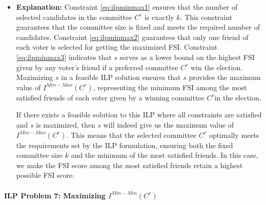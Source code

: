 \documentclass{article}
\begin{document}
\begin{itemize}
\item  \textbf{Explanation:}
Constraint \ref{eq:ilpminmax1} ensures that the number of selected candidates in the committee \(C^r\) is exactly \(k\). This constraint guarantees that the committee size is fixed and meets the required number of candidates.
Constraint \ref{eq:ilpminmax2} guarantees that only one friend of each voter is selected for getting the maximized FSI.
Constraint \ref{eq:ilpminmax3} indicates that \(s\) serves as a lower bound on the highest FSI given by any voter's friend if a preferred committee \(C^r\) win the election. Maximizing \(s\) in a feasible ILP solution ensures that \(s\) provides the maximum value of \(I^{Min-Max}(C^{r})\), representing the minimum FSI among the most satisfied friends of each voter given by a winning committee \(C^r\)in the election. 

If there exists a feasible solution to this ILP where all constraints are satisfied and \(s\) is maximized, then \(s\) will indeed give us the maximum value of \(I^{Min-Max}(C^{r})\). This means that the selected committee \(C^r\) optimally meets the requirements set by the ILP formulation, ensuring both the fixed committee size \(k\) and the minimum of the most satisfied friends. In this case, we make the FSI score among the most satisfied friends retain a highest possible FSI score.
\end{itemize}

\paragraph*{ILP Problem 7: Maximizing  $I^{Min-Min}(C^{r})$}
\end{document}
